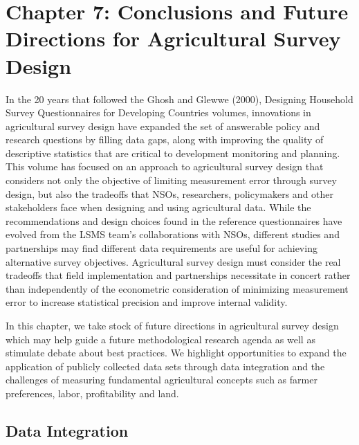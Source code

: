 \documentclass[
]{book}
\begin{document}
\hypertarget{chapter-7-conclusions-and-future-directions-for-agricultural-survey-design}{%
\chapter{Chapter 7: Conclusions and Future Directions for Agricultural Survey Design}\label{chapter-7-conclusions-and-future-directions-for-agricultural-survey-design}}

In the 20 years that followed the Ghosh and Glewwe (2000), Designing Household Survey Questionnaires for Developing Countries volumes, innovations in agricultural survey design have expanded the set of answerable policy and research questions by filling data gaps, along with improving the quality of descriptive statistics that are critical to development monitoring and planning. This volume has focused on an approach to agricultural survey design that considers not only the objective of limiting measurement error through survey design, but also the tradeoffs that NSOs, researchers, policymakers and other stakeholders face when designing and using agricultural data. While the recommendations and design choices found in the reference questionnaires have evolved from the LSMS team's collaborations with NSOs, different studies and partnerships may find different data requirements are useful for achieving alternative survey objectives. Agricultural survey design must consider the real tradeoffs that field implementation and partnerships necessitate in concert rather than independently of the econometric consideration of minimizing measurement error to increase statistical precision and improve internal validity.

In this chapter, we take stock of future directions in agricultural survey design which may help guide a future methodological research agenda as well as stimulate debate about best practices. We highlight opportunities to expand the application of publicly collected data sets through data integration and the challenges of measuring fundamental agricultural concepts such as farmer preferences, labor, profitability and land.

\hypertarget{data-integration}{%
\section{Data Integration}\label{data-integration}}
\end{document}
